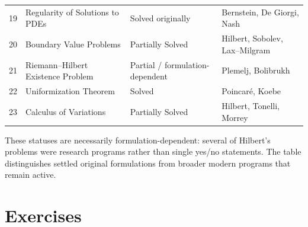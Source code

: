 \begin{center}
\begin{tabular}{c >{\raggedright\arraybackslash}p{3.8cm} >{\raggedright\arraybackslash}p{1.6cm} >{\raggedright\arraybackslash}p{3.8cm}}
19 & Regularity of Solutions to PDEs & Solved originally & Bernstein, De Giorgi, Nash \\
20 & Boundary Value Problems & Partially Solved & Hilbert, Sobolev, Lax--Milgram \\
21 & Riemann--Hilbert Existence Problem & Partial / formulation-dependent & Plemelj, Bolibrukh \\
22 & Uniformization Theorem & Solved & Poincar\'e, Koebe \\
23 & Calculus of Variations & Partially Solved & Hilbert, Tonelli, Morrey \\
\bottomrule
\end{tabular}
\end{center}

\vspace{1em}

\noindent These statuses are necessarily formulation-dependent: several of Hilbert's problems were research programs rather than single yes/no statements. The table distinguishes settled original formulations from broader modern programs that remain active.

\section*{Exercises}

